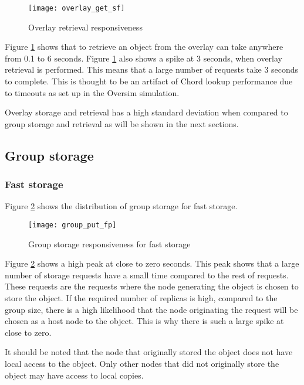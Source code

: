 \begin{figure}[htbp]
 \centering
 \texttt{[image: overlay\_get\_sf]}
 \caption{Overlay retrieval responsiveness}
 \label{fig_overlay_get_sf}
\end{figure}
%
Figure \ref{fig_overlay_get_sf} shows that to retrieve an object from the overlay can take anywhere from 0.1 to 6 seconds. Figure \ref{fig_overlay_get_sf} also shows a spike at 3 seconds, when overlay retrieval is performed. This means that a large number of requests take 3 seconds to complete. This is thought to be an artifact of Chord lookup performance due to timeouts as set up in the Oversim simulation.

Overlay storage and retrieval has a high standard deviation when compared to group storage and retrieval as will be shown in the next sections.


\subsection{Group storage}
\label{group_storage_eval}

\subsubsection{Fast storage}
\label{group_put_f_fp}

Figure \ref{fig_group_put_fp} shows the distribution of group storage for fast storage.

\begin{figure}[htbp]
 \centering
 \texttt{[image: group\_put\_fp]}
 \caption{Group storage responsiveness for fast storage}
 \label{fig_group_put_fp}
\end{figure}
%
Figure \ref{fig_group_put_fp} shows a high peak at close to zero seconds. This peak shows that a large number of storage requests have a small time compared to the rest of requests. These requests are the requests where the node generating the object is chosen to store the object. If the required number of replicas is high, compared to the group size, there is a high likelihood that the node originating the request will be chosen as a host node to the object. This is why there is such a large spike at close to zero.

It should be noted that the node that originally stored the object does not have local access to the object. Only other nodes that did not originally store the object may have access to local copies.

